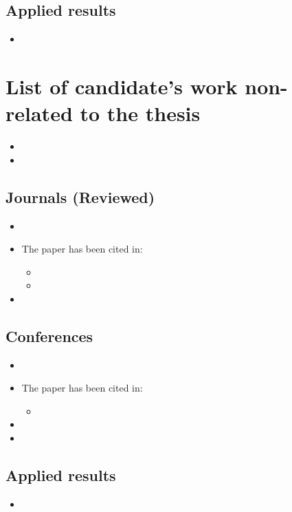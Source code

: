 \subsection*{Applied results}
\begin{itemize}
	\item {}		
\end{itemize}









\section*{List of candidate’s work non-related to the thesis}

\begin{itemize}
	\item {}
	\item {}
\end{itemize}

\subsection*{Journals (Reviewed)}
\begin{itemize}
	\item {}
	\item {}
	\vglue 1mm
	The paper has been cited in:	
	\begin{itemize}
		\item {}
		\item {}
	\end{itemize}	
	\item {}
\end{itemize}

\subsection*{Conferences}
\begin{itemize}
	\item {}
	\item {}
	\vglue 1mm
	The paper has been cited in:
	\begin{itemize}
		\item {}
	\end{itemize}
	\item {}
	\item {}
\end{itemize}

\subsection*{Applied results}
\begin{itemize}
	\item {}		
\end{itemize}

